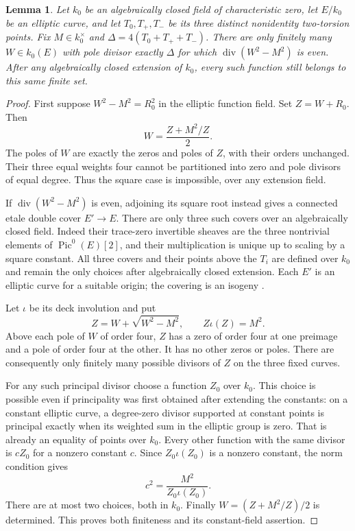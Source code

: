 \documentclass[11pt,a4paper]{article}
\newtheorem{lemma}[theorem]{Lemma}
\theoremstyle{remark}\newtheorem{remark}[theorem]{Remark}
\DeclareMathOperator{\divisor}{div}\DeclareMathOperator{\Pic}{Pic}
\begin{document}
\begin{lemma}\label{lem:finite}
Let $k_0$ be an algebraically closed field of characteristic zero,
let $E/k_0$ be an elliptic curve, and let $T_0,T_+,T_-$ be its
three distinct nonidentity two-torsion points. Fix
$M\in k_0^\times$ and $\Delta=4(T_0+T_++T_-)$. There are
only finitely many $W\in k_0(E)$ with pole divisor exactly
$\Delta$ for which $\divisor(W^2-M^2)$ is even.
After any algebraically closed extension of $k_0$, every such
function still belongs to this same finite set.
\end{lemma}
\begin{proof}
First suppose $W^2-M^2=R_0^2$ in the elliptic function field.
Set $Z=W+R_0$. Then
\[
                   W=\frac{Z+M^2/Z}{2}.
\]
The poles of $W$ are exactly the zeros and poles of $Z$, with
their orders unchanged. Their three equal weights four cannot
be partitioned into zero and pole divisors of equal degree.
Thus the square case is impossible, over any extension field.

If $\divisor(W^2-M^2)$ is even, adjoining its square root instead
gives a connected etale double cover $E'\to E$. There are only
three such covers over an algebraically closed field. Indeed their
trace-zero invertible sheaves are the three nontrivial elements of
$\Pic^0(E)[2]$, and their multiplication is unique up to scaling
by a square constant. All three covers and their points above the
$T_i$ are defined over $k_0$ and remain the only choices after
algebraically closed extension. Each $E'$ is an elliptic curve
for a suitable origin; the covering is an isogeny
\cite[Remark~15.3]{Milne}.

Let $\iota$ be its deck involution and put
\[
               Z=W+\sqrt{W^2-M^2},\qquad Z\iota(Z)=M^2.
\]
Above each pole of $W$ of order four, $Z$ has a zero of order
four at one preimage and a pole of order four at the other.
It has no other zeros or poles. There are consequently only
finitely many possible divisors of $Z$ on the three fixed curves.

For any such principal divisor choose a function $Z_0$ over $k_0$.
This choice is possible even if principality was first obtained
after extending the constants: on a constant elliptic curve, a
degree-zero divisor supported at constant points is principal
exactly when its weighted sum in the elliptic group is zero.
That is already an equality of points over $k_0$.
Every other function with the same divisor is $cZ_0$ for a
nonzero constant $c$. Since $Z_0\iota(Z_0)$ is a nonzero constant,
the norm condition gives
\[
                      c^2=\frac{M^2}{Z_0\iota(Z_0)}.
\]
There are at most two choices, both in $k_0$. Finally
$W=(Z+M^2/Z)/2$ is determined. This proves both finiteness and
its constant-field assertion.
\end{proof}
\end{document}
